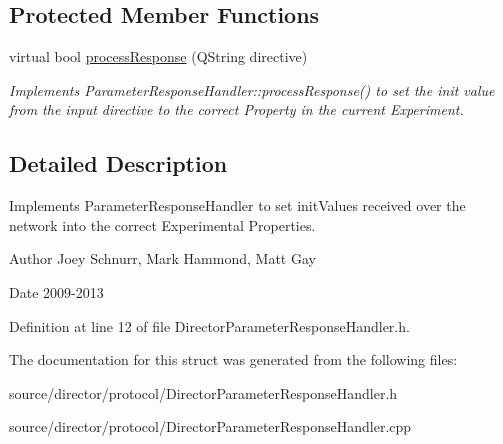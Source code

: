 \subsection*{Protected Member Functions}
\begin{DoxyCompactItemize}
\item 
\hypertarget{struct_director_parameter_response_handler_a369e000f3353d6fe009b40ae41736599}{virtual bool \hyperlink{struct_director_parameter_response_handler_a369e000f3353d6fe009b40ae41736599}{process\-Response} (Q\-String directive)}\label{struct_director_parameter_response_handler_a369e000f3353d6fe009b40ae41736599}

\begin{DoxyCompactList}\small\item\em Implements Parameter\-Response\-Handler\-::process\-Response() to set the init value from the input directive to the correct Property in the current Experiment. \end{DoxyCompactList}\end{DoxyCompactItemize}


\subsection{Detailed Description}
Implements Parameter\-Response\-Handler to set init\-Values received over the network into the correct Experimental Properties. 

\begin{DoxyAuthor}{Author}
Joey Schnurr, Mark Hammond, Matt Gay 
\end{DoxyAuthor}
\begin{DoxyDate}{Date}
2009-\/2013 
\end{DoxyDate}


Definition at line 12 of file Director\-Parameter\-Response\-Handler.\-h.



The documentation for this struct was generated from the following files\-:\begin{DoxyCompactItemize}
\item 
source/director/protocol/Director\-Parameter\-Response\-Handler.\-h\item 
source/director/protocol/Director\-Parameter\-Response\-Handler.\-cpp\end{DoxyCompactItemize}

